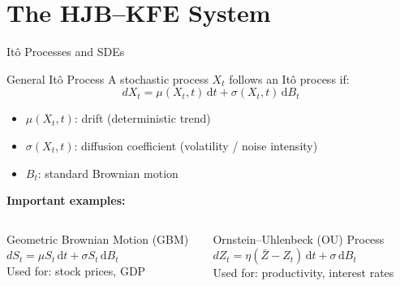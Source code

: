 \documentclass[aspectratio=169,11pt]{beamer}
\newcommand{\emphc}[1]{\textcolor{harvardcrimson}{#1}}
\newcommand{\ud}{\,\mathrm{d}}
\begin{document}
\section{The HJB--KFE System}
\begin{frame}{It\^o Processes and SDEs}
\small
\begin{block}{General It\^o Process}
A stochastic process $X_t$ follows an \emphc{It\^o process} if:
\vspace{-0.3em}
\[
\boxed{dX_t = \mu(X_t, t)\ud t + \sigma(X_t, t)\ud B_t}
\]
\vspace{-0.5em}
\begin{itemize}\itemsep1pt
    \item $\mu(X_t, t)$: \emphc{drift} (deterministic trend)
    \item $\sigma(X_t, t)$: \emphc{diffusion coefficient} (volatility / noise intensity)
    \item $B_t$: standard Brownian motion
\end{itemize}
\end{block}

\vspace{0.1em}
\textbf{Important examples:}
\begin{columns}[T]
\begin{exampleblock}{\small Geometric Brownian Motion (GBM)}
$dS_t = \mu S_t \ud t + \sigma S_t \ud B_t$\\[2pt]
{\small Used for: stock prices, GDP}
\end{exampleblock}

\begin{exampleblock}{\small Ornstein--Uhlenbeck (OU) Process}
$dZ_t = \eta(\bar{Z} - Z_t)\ud t + \sigma \ud B_t$\\[2pt]
{\small Used for: productivity, interest rates}
\end{exampleblock}
\end{columns}
\end{frame}
\end{document}
